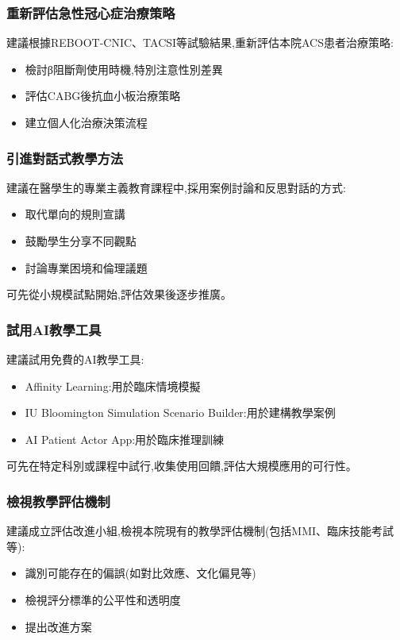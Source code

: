 \documentclass[12pt,a4paper]{article}
\begin{document}
\subsubsection{重新評估急性冠心症治療策略}

建議根據REBOOT-CNIC、TACSI等試驗結果,重新評估本院ACS患者治療策略:
\begin{itemize}[nosep]
    \item 檢討β阻斷劑使用時機,特別注意性別差異
    \item 評估CABG後抗血小板治療策略
    \item 建立個人化治療決策流程
\end{itemize}

\subsubsection{引進對話式教學方法}

建議在醫學生的專業主義教育課程中,採用案例討論和反思對話的方式:
\begin{itemize}[nosep]
    \item 取代單向的規則宣講
    \item 鼓勵學生分享不同觀點
    \item 討論專業困境和倫理議題
\end{itemize}

可先從小規模試點開始,評估效果後逐步推廣。

\subsubsection{試用AI教學工具}

建議試用免費的AI教學工具:
\begin{itemize}[nosep]
    \item Affinity Learning:用於臨床情境模擬
    \item IU Bloomington Simulation Scenario Builder:用於建構教學案例
    \item AI Patient Actor App:用於臨床推理訓練
\end{itemize}

可先在特定科別或課程中試行,收集使用回饋,評估大規模應用的可行性。

\subsubsection{檢視教學評估機制}

建議成立評估改進小組,檢視本院現有的教學評估機制(包括MMI、臨床技能考試等):
\begin{itemize}[nosep]
    \item 識別可能存在的偏誤(如對比效應、文化偏見等)
    \item 檢視評分標準的公平性和透明度
    \item 提出改進方案
\end{itemize}
\end{document}
